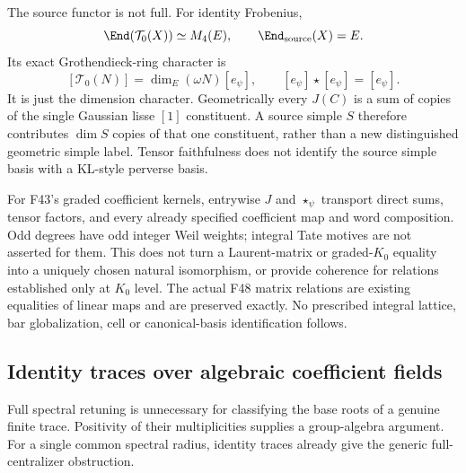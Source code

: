 \documentclass[11pt,a4paper]{article}
\newcommand{\fid}[1]{\textsf{#1}}\newcommand{\gate}[1]{\textsf{#1}}
\theoremstyle{named}\newtheorem{finding}{Finding}[section]
\theoremstyle{definition}\newtheorem{definition}[finding]{Definition}
\theoremstyle{remark}\newtheorem{remark}[finding]{Remark}
\begin{document}
The source functor is not full. For identity Frobenius,
\[
 \End(\mathcal T_0(X))\simeq M_4(E),\qquad
 \End_{\mathrm{source}}(X)=E.
\]
Its exact Grothendieck-ring character is
\[
 [\mathcal T_0(N)]=\dim_E(\omega N)[e_\psi],
 \qquad [e_\psi]\star[e_\psi]=[e_\psi].
\]
It is just the dimension character.
Geometrically every $J(C)$ is a sum of copies of the
single Gaussian lisse $[1]$ constituent.
A source simple $S$ therefore contributes $\dim S$
copies of that one constituent, rather than a new
distinguished geometric simple label.
Tensor faithfulness does not identify the source
simple basis with a KL-style perverse basis.

For \fid{F43}'s graded coefficient kernels, entrywise
$J$ and $\star_\psi$ transport direct sums, tensor
factors, and every already specified coefficient
map and word composition.
Odd degrees have odd integer Weil weights; integral
Tate motives are not asserted for them.
This does not turn a Laurent-matrix or graded-$K_0$
equality into a uniquely chosen natural isomorphism,
or provide coherence for relations established only
at $K_0$ level. The actual \fid{F48} matrix relations
are existing equalities of linear maps and are
preserved exactly.
No prescribed integral lattice, bar globalization,
cell or canonical-basis identification follows.

\subsection{Identity traces over algebraic coefficient fields}
Full spectral retuning is unnecessary for classifying the
base roots of a genuine finite trace. Positivity of their
multiplicities supplies a group-algebra argument. For a
single common spectral radius, identity traces already
give the generic full-centralizer obstruction.
\end{document}
